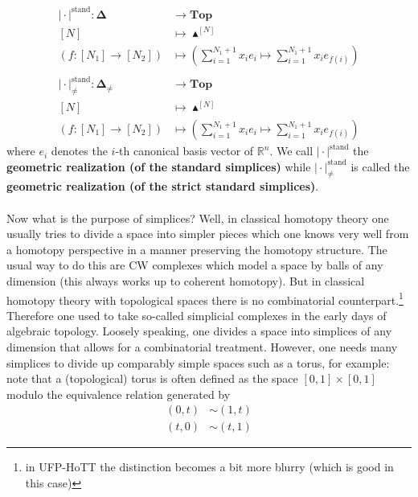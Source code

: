 \begin{align*}
  \vert
    \cdot
  \vert^{\textrm{stand}}
  \colon
  \mathbf{\Delta}
  &\rightarrow
  \mathbf{Top}
  \\
  [N]
  &\mapsto
  \blacktriangle^{[N]}
  \\
  \left(
    f
    \colon
    [N_{1}]
    \rightarrow
    [N_{2}]
  \right)
  &\mapsto
  \left(
    \sum_{i=1}^{N_{1}+1}
    x_{i}e_{i}
    \mapsto
    \sum_{i=1}^{N_{1}+1}
    x_{i}e_{f(i)}
  \right)
  \\\\
  \vert
    \cdot
  \vert_{\neq}^{\textrm{stand}}
  \colon
  \mathbf{\Delta}_{\neq}
  &\rightarrow
  \mathbf{Top}
  \\
  [N]
  &\mapsto
  \blacktriangle^{[N]}
  \\
  \left(
    f
    \colon
    [N_{1}]
    \rightarrow
    [N_{2}]
  \right)
  &\mapsto
  \left(
    \sum_{i=1}^{N_{1}+1}
    x_{i}e_{i}
    \mapsto
    \sum_{i=1}^{N_{1}+1}
    x_{i}e_{f(i)}
  \right)
\end{align*}
where $e_{i}$ denotes the $i$-th canonical basis vector of $\mathbb{R}^{n}$. We call $\vert \cdot \vert^{\textrm{stand}}$ the \textbf{geometric realization (of the standard simplices)} while $\vert \cdot \vert_{\neq}^{\textrm{stand}}$ is called the \textbf{geometric realization (of the strict standard simplices)}.
\\\\
Now what is the purpose of simplices? Well, in classical homotopy theory one usually tries to divide a space into simpler pieces which one knows very well from a homotopy perspective in a manner preserving the homotopy structure. The usual way to do this are CW complexes which model a space by balls of any dimension (this always works up to coherent homotopy). But in classical homotopy theory with topological spaces there is no combinatorial counterpart.\footnote{in UFP-HoTT the distinction becomes a bit more blurry (which is good in this case)} Therefore one used to take so-called simplicial complexes in the early days of algebraic topology. Loosely speaking, one divides a space into simplices of any dimension that allows for a combinatorial treatment. However, one needs many simplices to divide up comparably simple spaces such as a torus, for example: note that a (topological) torus is often defined as the space $[0,1] \times [0,1]$ modulo the equivalence relation generated by
\begin{align*}
  (0,t)
  &\sim
  (1,t)
  \\
  (t,0)
  &\sim
  (t,1)
\end{align*}
